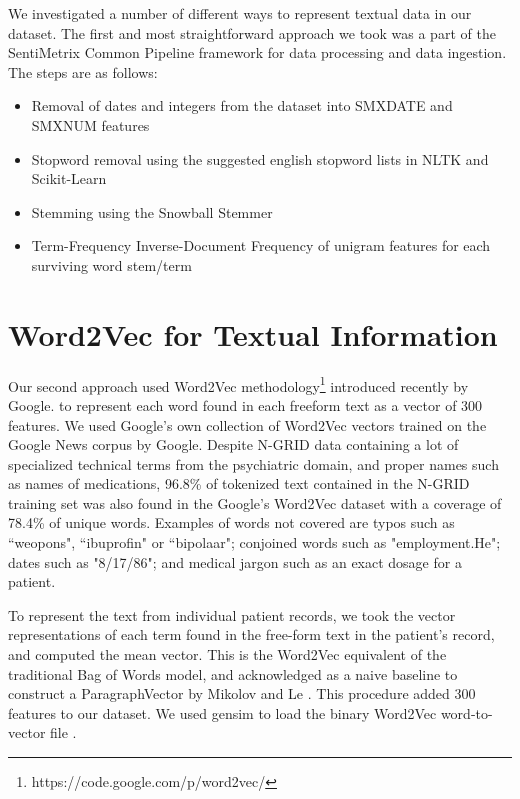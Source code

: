 We investigated a number of different ways to represent textual data in our dataset. The first and most straightforward approach we took was a part of the SentiMetrix Common Pipeline framework for data processing and data ingestion. The steps are as follows: 
 
 
 \begin{itemize}
     \item Removal of dates and integers from the dataset into \textsf{SMXDATE} and \textsf{SMXNUM} features
     \item Stopword removal using the suggested english stopword lists in NLTK \cite{nltk} and Scikit-Learn \cite{scikit-learn}
     \item Stemming using the Snowball Stemmer \cite{snowball}
     
     \item Term-Frequency Inverse-Document Frequency \cite{tf-idf,ir-textbook} of unigram features for each surviving word stem/term
     
\end{itemize}

 
 \section{Word2Vec for Textual Information} \label{sec:word2vec-for-textual-info} Our second approach used
 \textsf{Word2Vec} 
 methodology\footnote{https://code.google.com/p/word2vec/} \cite{word2vec} introduced
 recently by Google.
to represent each word found in each freeform text as a vector of 300 features.
We used Google's own collection of Word2Vec vectors trained on the Google News
corpus by Google. Despite N-GRID data containing a lot of
specialized technical terms from the psychiatric domain, and proper names such as
names of medications, 96.8\% of tokenized text contained in the N-GRID training set
was also found in the Google's \textsf{Word2Vec} dataset with a coverage of 78.4\% of unique words. Examples of
words not covered are typos such as \textsf{``weopons"}, \textsf{``ibuprofin"} or \textsf{``bipolaar"}; conjoined words such as \textsf{"employment.He"}; dates such as \textsf{"8/17/86"}; and medical jargon such as an exact dosage for a patient.

To represent the text from individual patient records, we took the vector
representations of each term found in the free-form text in the patient's record,
and computed the mean vector. This is the Word2Vec 
equivalent of the traditional Bag of Words model, and acknowledged as a naive baseline to construct a
\textsf{ParagraphVector} by Mikolov and Le \cite{doc2vec}.  This procedure added 300 features to our dataset. We used gensim to load the binary Word2Vec word-to-vector file \cite{gensim}. 
 
